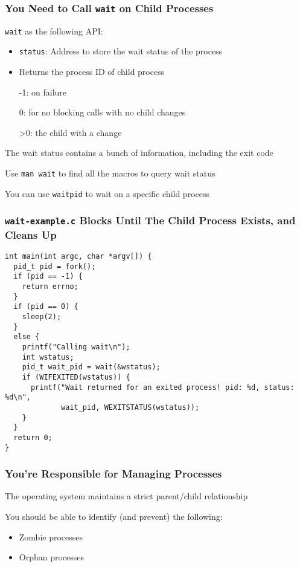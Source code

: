   \begin{frame}
    \frametitle{You Need to Call \texttt{wait} on Child Processes}

    \texttt{wait} as the following API:
    \begin{itemize}
      \item \texttt{status}: Address to store the wait status of the process
      \item Returns the process ID of child process

            \hspace{2em} -1: on failure

            \hspace{2em} 0: for no blocking calls with no child changes

            \hspace{2em} >0: the child with a change
    \end{itemize}

    \vspace{2em}

    The wait status contains a bunch of information, including the exit code

    \hspace{2em} Use \texttt{man wait} to find all the macros to query wait status

    \hspace{4em} You can use \texttt{waitpid} to wait on a specific child process
  \end{frame}

  \begin{frame}[fragile]
    \frametitle{\texttt{wait-example.c} Blocks Until The Child Process Exists, and Cleans Up}

    \begin{lstlisting}
int main(int argc, char *argv[]) {
  pid_t pid = fork();
  if (pid == -1) {
    return errno;
  }
  if (pid == 0) {
    sleep(2);
  }
  else {
    printf("Calling wait\n");
    int wstatus;
    pid_t wait_pid = wait(&wstatus);
    if (WIFEXITED(wstatus)) {
      printf("Wait returned for an exited process! pid: %d, status: %d\n",
             wait_pid, WEXITSTATUS(wstatus));
    }
  }
  return 0;
}
    \end{lstlisting}
  \end{frame}

  \begin{frame}
    \frametitle{You're Responsible for Managing Processes}

    The operating system maintains a strict parent/child relationship
    
    \vspace{2em}
    
    You should be able to identify (and prevent) the following:
    \begin{itemize}
      \item Zombie processes
      \item Orphan processes
    \end{itemize}
  \end{frame}


